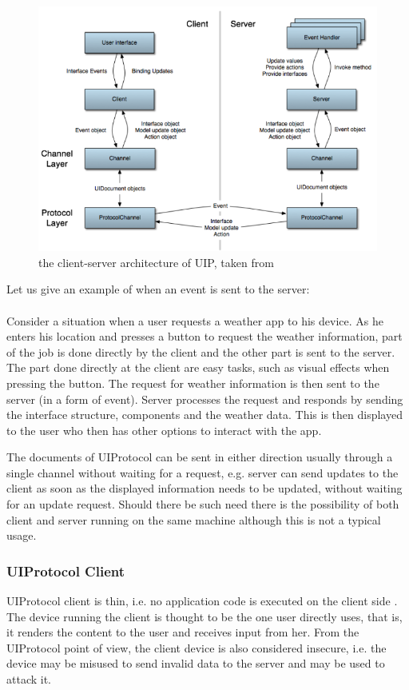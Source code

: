 \begin{figure}[ht!]
\centering
\includegraphics[width=135mm]{pics/UIParchitecture.png}
\caption{the client-server architecture of UIP, taken from \cite{uip}}

\label{fig:UIParchitecture}
\end{figure}

Let us give an example of when an event is sent to the server:\\\\
Consider a situation when a user requests a weather app to his device. As he enters his location and presses a button to request the weather information, part of the job is done directly by the client and the other part is sent to the server. The part done directly at the client are easy tasks, such as visual effects when pressing the button. The request for weather information is then sent to the server (in a form of event). Server processes the request and responds by sending the interface structure, components and the weather data. This is then displayed to the user who then has other options to interact with the app.

The documents of UIProtocol can be sent in either direction usually through a single channel without waiting for a request, e.g. server can send updates to the client as soon as the displayed information needs to be updated, without waiting for an update request. Should there be such need there is the possibility of both client and server running on the same machine although this is not a typical usage.

\subsubsection{UIProtocol Client}
UIProtocol client is thin, i.e. no application code is executed on the client side \cite{uip}. The device running the client is thought to be the one user directly uses, that is, it renders the content to the user and receives input from her. From the UIProtocol point of view, the client device is also considered insecure, i.e. the device may be misused to send invalid data to the server and may be used to attack it.

